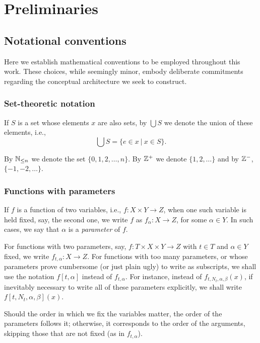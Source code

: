 \section{Preliminaries}

\subsection{Notational conventions}

Here we establish mathematical conventions to be employed throughout this work. These choices, while seemingly minor, embody deliberate commitments regarding the conceptual architecture we seek to construct.

\subsubsection{Set-theoretic notation}

If $S$ is a set whose elements $x$ are also sets, by $\bigcup S$ we denote the union of these elements, i.e., 
\[\bigcup S = \{ e \in x\ |\ x \in S\}.\]
 
By $\mathbb{N}_{\leq n}$ we denote the set $\{0, 1, 2, \dots, n\}$. By $\mathbb{Z}^+$ we denote $\{1, 2, \dots\}$ and by $\mathbb{Z}^-$, $\{-1, -2, \dots\}$.

\subsubsection{Functions with parameters}

If $f$ is a function of two variables, i.e., $f: X \times Y \rightarrow Z$, when one such variable is held fixed, say, the second one, we write $f$ as $f_\alpha : X \rightarrow Z$, for some $\alpha \in Y$. In such cases, we say that $\alpha$ is a \textit{parameter} of $f$. 

For functions with two parameters, say, $f: T \times X \times Y \rightarrow Z$ with $t\in T$ and $\alpha \in Y$ fixed, we write $f_{t, \alpha} : X \rightarrow Z$. For functions with too many parameters, or whose parameters prove cumbersome (or just plain ugly) to write as subscripts, we shall use the notation $f[t, \alpha]$ instead of $f_{t, \alpha}$. For instance, instead of $f_{t, N_t, \alpha, \beta}(x)$, if inevitably necessary to write all of these parameters explicitly, we shall write $f[t, N_t, \alpha, \beta](x)$. 

Should the order in which we fix the variables matter, the order of the parameters follows it; otherwise, it corresponds to the order of the arguments, skipping those that are not fixed (as in $f_{t, \alpha}$).  

